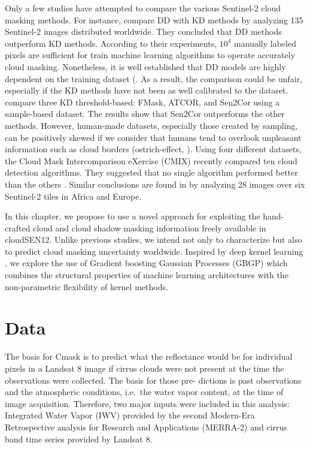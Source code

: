 \documentclass[a4paper, nobind]{templates/cdethesis}
\begin{document}
Only a few studies have attempted to compare the various Sentinel-2 cloud masking methods. For instance, \cite{Cilli} compare DD with KD methods by analyzing 135 Sentinel-2 images distributed worldwide. They concluded that DD methods outperform KD methods. According to their experiments, \(10^{4}\) manually labeled pixels are sufficient for train machine learning algorithms to operate accurately cloud masking. Nonetheless, it is well established that DD models are highly dependent on the training dataset (\cite{Lopez-Puigdollers2021}. As a result, the comparison could be unfair, especially if the KD methods have not been as well calibrated to the dataset. \cite{Zekoll2021} compare three KD threshold-based: FMask, ATCOR, and Sen2Cor using a sample-based dataset. The results show that Sen2Cor outperforms the other methods. However, human-made datasets, especially those created by sampling, can be positively skewed if we consider that humans tend to overlook unpleasant information such as cloud borders (ostrich-effect, \cite{Valdez2017}). Using four different datasets, the Cloud Mask Intercomparison eXercise (CMIX) recently compared ten cloud detection algorithms. They suggested that no single algorithm performed better than the others \cite{Skakun2022}. Similar conclusions are found in \cite{tarrio2020comparison} by analyzing 28 images over six Sentinel-2 tiles in Africa and Europe.

In this chapter, we propose to use a novel approach for exploiting the hand-crafted cloud and cloud shadow masking information freely available in cloudSEN12. Unlike previous studies, we intend not only to characterize but also to predict cloud masking uncertainty worldwide. Inspired by deep kernel learning \cite{wilson2016deep}, we explore the use of Gradient boosting Gaussian Processes (GBGP) which combines the structural properties of machine learning architectures with the non-parametric flexibility of kernel methods.

\hypertarget{data}{%
\section{Data}\label{data}}

The basis for Cmask is to predict what the reflectance would be for individual pixels in a Landsat 8 image if cirrus clouds were not present at the time the observations were collected. The basis for those pre- dictions is past observations and the atmospheric conditions, i.e.~the water vapor content, at the time of image acquisition. Therefore, two major inputs were included in this analysis: Integrated Water Vapor (IWV) provided by the second Modern-Era Retrospective analysis for Research and Applications (MERRA-2) and cirrus band time series provided by Landsat 8.
\end{document}
